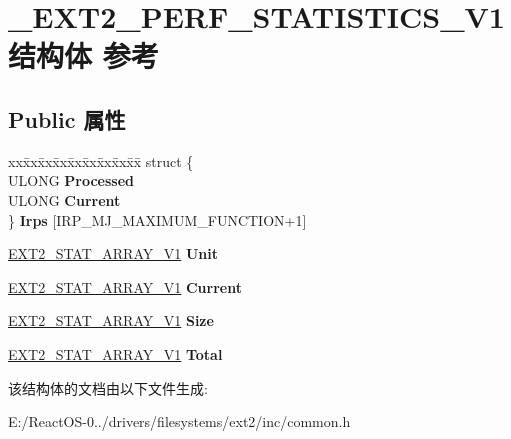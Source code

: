 \hypertarget{struct___e_x_t2___p_e_r_f___s_t_a_t_i_s_t_i_c_s___v1}{}\section{\+\_\+\+E\+X\+T2\+\_\+\+P\+E\+R\+F\+\_\+\+S\+T\+A\+T\+I\+S\+T\+I\+C\+S\+\_\+\+V1结构体 参考}
\label{struct___e_x_t2___p_e_r_f___s_t_a_t_i_s_t_i_c_s___v1}
\subsection*{Public 属性}
\begin{DoxyCompactItemize}
\item 
\mbox{\label{struct___e_x_t2___p_e_r_f___s_t_a_t_i_s_t_i_c_s___v1_a57609ba11fca3a7f64543be8a66b8c6d}} 
\begin{tabbing}
xx\=xx\=xx\=xx\=xx\=xx\=xx\=xx\=xx\=\kill
struct \{\\
\>ULONG {\bfseries Processed}\\
\>ULONG {\bfseries Current}\\
\} {\bfseries Irps} \mbox{[}IRP\_MJ\_MAXIMUM\_FUNCTION+1\mbox{]}\\

\end{tabbing}\item 
\mbox{\label{struct___e_x_t2___p_e_r_f___s_t_a_t_i_s_t_i_c_s___v1_acb36bc5bb23b724ff307bc46e9366105}} 
\hyperlink{union_e_x_t2___s_t_a_t___a_r_r_a_y___v1}{E\+X\+T2\+\_\+\+S\+T\+A\+T\+\_\+\+A\+R\+R\+A\+Y\+\_\+\+V1} {\bfseries Unit}
\item 
\mbox{\label{struct___e_x_t2___p_e_r_f___s_t_a_t_i_s_t_i_c_s___v1_aed767a76c564ca6b8e8da021269d7b02}} 
\hyperlink{union_e_x_t2___s_t_a_t___a_r_r_a_y___v1}{E\+X\+T2\+\_\+\+S\+T\+A\+T\+\_\+\+A\+R\+R\+A\+Y\+\_\+\+V1} {\bfseries Current}
\item 
\mbox{\label{struct___e_x_t2___p_e_r_f___s_t_a_t_i_s_t_i_c_s___v1_acfb58f21c3c7f6f4979cf40ac8352158}} 
\hyperlink{union_e_x_t2___s_t_a_t___a_r_r_a_y___v1}{E\+X\+T2\+\_\+\+S\+T\+A\+T\+\_\+\+A\+R\+R\+A\+Y\+\_\+\+V1} {\bfseries Size}
\item 
\mbox{\label{struct___e_x_t2___p_e_r_f___s_t_a_t_i_s_t_i_c_s___v1_a66a12c39dfdf1b4c952334f3d94937d5}} 
\hyperlink{union_e_x_t2___s_t_a_t___a_r_r_a_y___v1}{E\+X\+T2\+\_\+\+S\+T\+A\+T\+\_\+\+A\+R\+R\+A\+Y\+\_\+\+V1} {\bfseries Total}
\end{DoxyCompactItemize}


该结构体的文档由以下文件生成\+:\begin{DoxyCompactItemize}
\item 
E\+:/\+React\+O\+S-\/0../drivers/filesystems/ext2/inc/common.\+h\end{DoxyCompactItemize}
